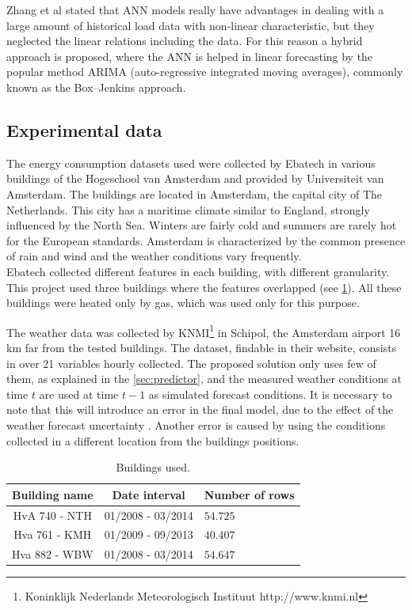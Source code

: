 \documentclass{sig-alternate-sigmod07}
\begin{document}
Zhang et al \cite{zhang1998forecasting} stated that ANN models really have advantages in dealing with a large amount of historical load data with non-linear characteristic, but they neglected the linear relations including the data. For this reason a hybrid approach is proposed, where the ANN is helped in linear forecasting by the popular method ARIMA (auto-regressive integrated moving averages), commonly known as the Box–Jenkins approach. 



\subsection{Experimental data}
The energy consumption datasets used were collected by Ebatech in various buildings of the Hogeschool van Amsterdam and provided by Universiteit van Amsterdam. The buildings are located in Amsterdam, the capital city of The Netherlands. This city has a maritime climate similar to England, strongly influenced by the North Sea. Winters are fairly cold and summers are rarely hot for the European standards. Amsterdam is characterized by the common presence of rain and wind and the weather conditions vary frequently.\\
Ebatech collected different features in each building, with different granularity. This project used three buildings where the features overlapped (see \cref{tab:dataset}). All these buildings were heated only by gas, which was used only for this purpose.

The weather data was collected by KNMI\footnote{Koninklijk Nederlands Meteorologisch Instituut http://www.knmi.nl} in Schipol, the Amsterdam airport 16 km far from the tested buildings. The dataset, findable in their website, consists in over 21 variables hourly collected. The proposed solution only uses few of them, as explained in the \cref{sec:predictor}, and the measured weather conditions at time $t$ are used at time $t-1$ as simulated forecast conditions. It is necessary to note that this will introduce an error in the final model, due to the effect of the weather forecast uncertainty \cite{douglas1998impacts, ranaweera1996effect}. Another error is caused by using the conditions collected in a different location from the buildings positions.

\begin{table}
\centering
\label{tab:dataset}
\begin{tabular}{|c|c|l|} \hline
Building name&Date interval&Number of rows\\ \hline\hline
HvA 740 - NTH & 01/2008 - 03/2014 & $54.725$\\ \hline
Hva 761 - KMH & 01/2009 - 09/2013 & $40.407$\\ \hline
Hva 882 - WBW& 01/2008 - 03/2014 & $54.647$\\ \hline
\end{tabular}
\caption{Buildings used.}
\end{table}
\end{document}
